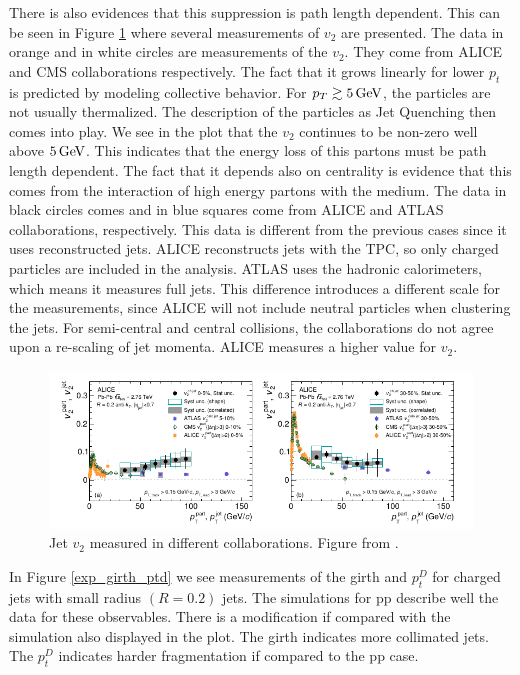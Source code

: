 There is also evidences that this suppression is path length dependent. This can be seen in Figure \ref{exp_jet_v2} where several measurements of $v_2$ are presented. The data in orange and in white circles are measurements of the $v_2$. They come from ALICE and CMS collaborations respectively. The fact that it grows linearly for lower $p_t$ is predicted by modeling collective behavior. For $p_T \gtrsim 5\,{\rm GeV}$, the particles are not usually thermalized. The description of the particles as Jet Quenching then comes into play. We see in the plot that the $v_2$ continues to be non-zero well above $5\,{\rm GeV}$. This indicates that the energy loss of this partons must be path length dependent. The fact that it depends also on centrality is evidence that this comes from the interaction of high energy partons with the medium. The data in black circles comes and in blue squares come from ALICE and ATLAS collaborations, respectively. This data is different from the previous cases since it uses reconstructed jets. ALICE reconstructs jets with the TPC, so only charged particles are included in the analysis. ATLAS uses the hadronic calorimeters, which means it measures full jets. This difference introduces a different scale for the measurements, since ALICE will not include neutral particles when clustering the jets. For semi-central and central collisions, the collaborations do not agree upon a re-scaling of jet momenta. ALICE measures a higher value for $v_2$.

\begin{figure}
\includegraphics[width=1.0\textwidth]{images/exp_v2.png}
\caption[Experimental Jet $v_2$]{Jet $v_2$ measured in different collaborations. Figure from \cite{connors_review_2017}.}
\label{exp_jet_v2}
\end{figure}

In Figure \ref{exp_girth_ptd} we see measurements of the girth and $p_t^{D}$ for charged jets with small radius $(R=0.2)$ jets. The simulations for pp describe well the data for these observables\cite{alice_collaboration_medium_2018}. There is a modification if compared with the simulation also displayed in the plot. The girth indicates more collimated jets. The $p_t^D$ indicates harder fragmentation if compared to the pp case.

